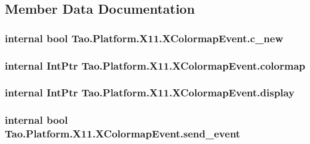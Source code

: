 \subsection{Member Data Documentation}
\hypertarget{struct_tao_1_1_platform_1_1_x11_1_1_x_colormap_event_a01a0a43e6ac568e317766bfb71cd09b0}{
\subsubsection[{c\_\-new}]{\setlength{\rightskip}{0pt plus 5cm}internal bool {\bf Tao.Platform.X11.XColormapEvent.c\_\-new}}}
\label{struct_tao_1_1_platform_1_1_x11_1_1_x_colormap_event_a01a0a43e6ac568e317766bfb71cd09b0}
\hypertarget{struct_tao_1_1_platform_1_1_x11_1_1_x_colormap_event_a5e54dd8ed6bbd6a653076a0cccbb750a}{
\subsubsection[{colormap}]{\setlength{\rightskip}{0pt plus 5cm}internal IntPtr {\bf Tao.Platform.X11.XColormapEvent.colormap}}}
\label{struct_tao_1_1_platform_1_1_x11_1_1_x_colormap_event_a5e54dd8ed6bbd6a653076a0cccbb750a}
\hypertarget{struct_tao_1_1_platform_1_1_x11_1_1_x_colormap_event_ad55ed519a88be3649ad3725acc8cb56e}{
\subsubsection[{display}]{\setlength{\rightskip}{0pt plus 5cm}internal IntPtr {\bf Tao.Platform.X11.XColormapEvent.display}}}
\label{struct_tao_1_1_platform_1_1_x11_1_1_x_colormap_event_ad55ed519a88be3649ad3725acc8cb56e}
\hypertarget{struct_tao_1_1_platform_1_1_x11_1_1_x_colormap_event_a59a9eb53b303ce80bcab0926041802a2}{
\subsubsection[{send\_\-event}]{\setlength{\rightskip}{0pt plus 5cm}internal bool {\bf Tao.Platform.X11.XColormapEvent.send\_\-event}}}
